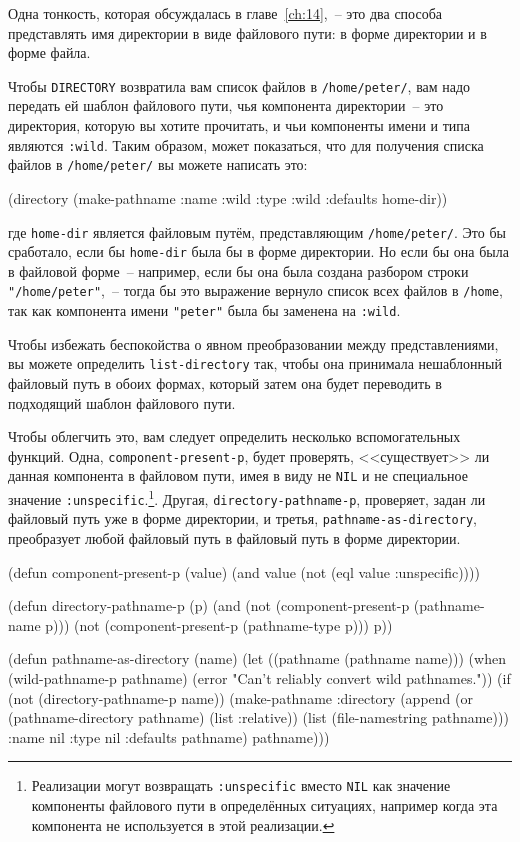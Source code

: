 Одна тонкость, которая обсуждалась в главе~\ref{ch:14},~-- это два способа представлять
имя директории в виде файлового пути: в форме директории и в форме файла.

Чтобы \lstinline{DIRECTORY} возвратила вам список файлов в \lstinline{/home/peter/}, вам надо
передать ей шаблон файлового пути, чья компонента директории~-- это директория, которую
вы хотите прочитать, и чьи компоненты имени и типа являются \lstinline{:wild}. Таким образом,
может показаться, что для получения списка файлов в \lstinline{/home/peter/} вы можете написать
это:

\begin{myverb}
(directory (make-pathname :name :wild :type :wild :defaults home-dir))
\end{myverb}

\noindent{}где \lstinline{home-dir} является файловым путём, представляющим \lstinline{/home/peter/}. Это бы
сработало, если бы \lstinline{home-dir} была бы в форме директории. Но если бы она была в
файловой форме~-- например, если бы она была создана разбором строки
\lstinline{"/home/peter"},~-- тогда бы это выражение вернуло список всех файлов в
\lstinline{/home}, так как компонента имени \lstinline{"peter"} была бы заменена на
\lstinline{:wild}.

Чтобы избежать беспокойства о явном преобразовании между представлениями, вы можете
определить \lstinline{list-directory} так, чтобы она принимала нешаблонный файловый путь в
обоих формах, который затем она будет переводить в подходящий шаблон файлового пути.

Чтобы облегчить это, вам следует определить несколько вспомогательных функций. Одна,
\lstinline{component-present-p}, будет проверять, <<существует>> ли данная компонента в
файловом пути, имея в виду не \lstinline{NIL} и не специальное значение
\lstinline{:unspecific}.\footnote{Реализации могут возвращать \lstinline{:unspecific}
  вместо \lstinline{NIL} как значение компоненты файлового пути в определённых ситуациях,
  например когда эта компонента не используется в этой реализации.}\hspace{\footnotenegspace}. Другая,
\lstinline{directory-pathname-p}, проверяет, задан ли файловый путь уже в форме
директории, и \mbox{третья}, \lstinline{pathname-as-directory}, преобразует любой файловый
путь в файловый путь в форме директории.

\begin{myverb}
(defun component-present-p (value)
  (and value (not (eql value :unspecific))))

(defun directory-pathname-p  (p)
  (and
   (not (component-present-p (pathname-name p)))
   (not (component-present-p (pathname-type p)))
   p))

(defun pathname-as-directory (name)
  (let ((pathname (pathname name)))
    (when (wild-pathname-p pathname)
      (error "Can't reliably convert wild pathnames."))
    (if (not (directory-pathname-p name))
      (make-pathname
       :directory (append (or (pathname-directory pathname) (list :relative))
                          (list (file-namestring pathname)))
       :name      nil
       :type      nil
       :defaults pathname)
      pathname)))
\end{myverb}

